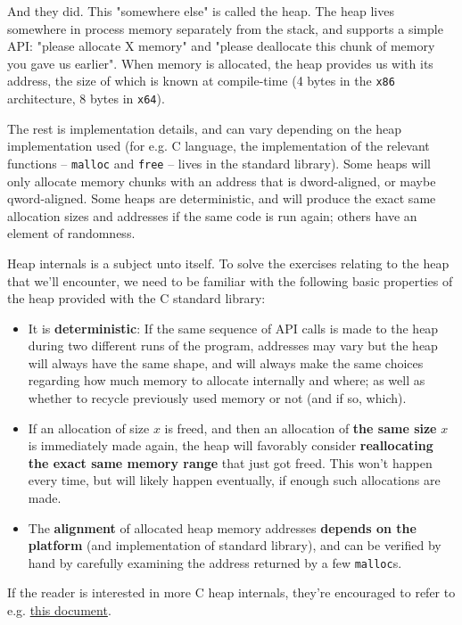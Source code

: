 \documentclass{article}
\newcommand{\xcode}[2]{\colorbox{ubuntuback}{\lstinline[language=#1]|#2|}}
\newcommand{\code}[1]{\colorbox{ubuntuback}{\texttt{#1}}}
\begin{document}
And they did. This "somewhere else" is called the heap. The heap lives somewhere in process memory separately from the stack, and supports a simple API: "please allocate X memory" and "please deallocate this chunk of memory you gave us earlier". When memory is allocated, the heap provides us with its address, the size of which is known at compile-time (4 bytes in the \code{x86} architecture, 8 bytes in \code{x64}). 

The rest is implementation details, and can vary depending on the heap implementation used (for e.g. C language, the implementation of the relevant functions -- \xcode{C}{malloc} and \xcode{C}{free} -- lives in the standard library). Some heaps will only allocate memory chunks with an address that is dword-aligned, or maybe qword-aligned. Some heaps are deterministic, and will produce the exact same allocation sizes and addresses if the same code is run again; others have an element of randomness.

Heap internals is a subject unto itself. To solve the exercises relating to the heap that we'll encounter, we need to be familiar with the following basic properties of the heap provided with the C standard library:

\begin{itemize}
    \item It is \textbf{deterministic}: If the same sequence of API calls is made to the heap during two different runs of the program, addresses may vary but the heap will always have the same shape, and will always make the same choices regarding how much memory to allocate internally and where; as well as whether to recycle previously used memory or not (and if so, which).
    \item If an allocation of size $x$ is freed, and then an allocation of \textbf{the same size} $x$ is immediately made again, the heap will favorably consider \textbf{reallocating the exact same memory range} that just got freed. This won't happen every time, but will likely happen eventually, if enough such allocations are made.
    \item The \textbf{alignment} of allocated heap memory addresses \textbf{depends on the platform} (and implementation of standard library), and can be verified by hand by carefully examining the address returned by a few \xcode{C}{malloc}s.
\end{itemize}

If the reader is interested in more C heap internals, they're encouraged to refer to e.g. \href{https://sourceware.org/glibc/wiki/MallocInternals}{this document}.
\end{document}
